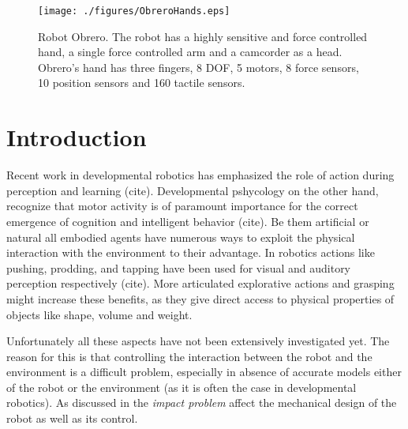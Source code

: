 \begin{figure}[tbp]
\centerline{
\texttt{[image: ./figures/ObreroHands.eps]}
} \caption{Robot Obrero. The robot has a highly sensitive and
force controlled hand, a single force controlled arm and a
camcorder as a head. Obrero's hand  has three fingers, 8 DOF, 5
motors, 8 force sensors, 10 position sensors and 160 tactile
sensors.} \label{fig:RobotObrero}
\end{figure}

\section{Introduction}

Recent work in developmental robotics has emphasized the role of action
during perception and learning (cite). Developmental pshycology on the 
other hand, recognize that motor activity is of paramount importance 
for the correct emergence of cognition and intelligent behavior (cite). 
Be them artificial or natural all embodied agents have numerous ways 
to exploit the physical interaction with the environment to their advantage. 
In robotics actions like pushing, prodding, and tapping have been used for 
visual and auditory perception respectively (cite). 
More articulated explorative actions and grasping might increase these benefits, 
as they give direct access to physical properties of objects like shape, volume
and weight.


Unfortunately all these aspects have not been extensively investigated yet. The 
reason for this is that controlling the interaction between the robot and 
the environment is a difficult problem, especially in absence of accurate 
models either of the robot or the environment (as it is often the case in 
developmental robotics). As discussed in \cite{volpe90real} the 
\emph{impact problem} affect the mechanical design of the robot as well as
its control.

